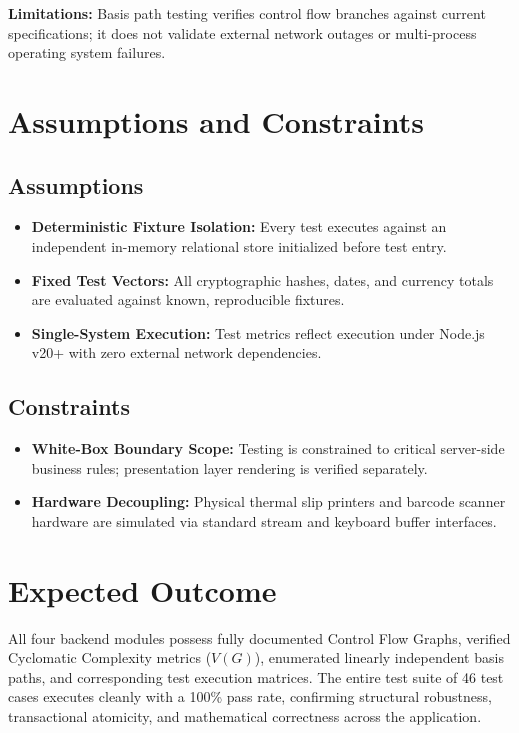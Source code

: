 \documentclass[12pt, a4paper]{report}
\begin{document}
\textbf{Limitations:} Basis path testing verifies control flow branches against current specifications; it does not validate external network outages or multi-process operating system failures.

\chapter{Assumptions and Constraints}

\section{Assumptions}
\begin{itemize}[leftmargin=1.5em]
  \item \textbf{Deterministic Fixture Isolation:} Every test executes against an independent in-memory relational store initialized before test entry.
  \item \textbf{Fixed Test Vectors:} All cryptographic hashes, dates, and currency totals are evaluated against known, reproducible fixtures.
  \item \textbf{Single-System Execution:} Test metrics reflect execution under Node.js v20+ with zero external network dependencies.
\end{itemize}

\section{Constraints}
\begin{itemize}[leftmargin=1.5em]
  \item \textbf{White-Box Boundary Scope:} Testing is constrained to critical server-side business rules; presentation layer rendering is verified separately.
  \item \textbf{Hardware Decoupling:} Physical thermal slip printers and barcode scanner hardware are simulated via standard stream and keyboard buffer interfaces.
\end{itemize}

\chapter{Expected Outcome}
All four backend modules possess fully documented Control Flow Graphs, verified Cyclomatic Complexity metrics ($V(G)$), enumerated linearly independent basis paths, and corresponding test execution matrices. The entire test suite of 46 test cases executes cleanly with a 100\% pass rate, confirming structural robustness, transactional atomicity, and mathematical correctness across the application.
\end{document}
